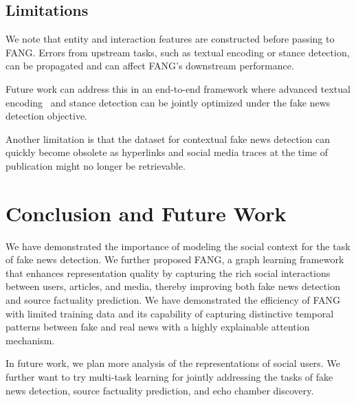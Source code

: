\documentclass[sigconf,anonymous]{acmart}
\theoremstyle{definition}
\theoremstyle{hypothesis}
\begin{document}
\subsection{Limitations}
We note that entity and interaction features are constructed before passing to FANG. Errors from upstream tasks, such as textual encoding or stance detection, can be propagated and can affect FANG's downstream performance. 

Future work can address this in an end-to-end framework where advanced textual encoding~\cite{devlin2019bert} and stance detection can be jointly optimized under the fake news detection objective. 

Another limitation is that the dataset for contextual fake news detection can quickly become obsolete as hyperlinks and social media traces at the time of publication might no longer be retrievable.

\section{Conclusion and Future Work}

We have demonstrated the importance of modeling the social context for the task of fake news detection. We further proposed FANG, a graph learning framework that enhances representation quality by capturing the rich social interactions between users, articles, and media, thereby improving both fake news detection and source factuality prediction. 
We have demonstrated the efficiency of FANG with limited training data and its capability of capturing distinctive temporal patterns between fake and real news with a highly explainable attention mechanism. 

In future work, we plan more analysis of the representations of social users. We further want to try multi-task learning for jointly addressing the tasks of fake news detection, source factuality prediction, and echo chamber discovery.






\appendix
\end{document}
